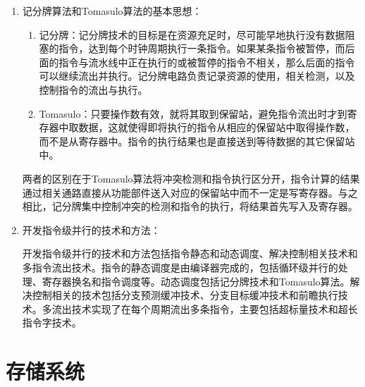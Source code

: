 \documentclass[a4paper]{ctexbook}
\begin{document}
\begin{enumerate}
  \item 记分牌算法和Tomasulo算法的基本思想：
  \begin{enumerate}
    \item 记分牌：记分牌技术的目标是在资源充足时，尽可能早地执行没有数据阻塞的指令，达到每个时钟周期执行一条指令。如果某条指令被暂停，而后面的指令与流水线中正在执行的或被暂停的指令不相关，那么后面的指令可以继续流出并执行。记分牌电路负责记录资源的使用，相关检测，以及控制指令的流出与执行。
    \item Tomasulo：只要操作数有效，就将其取到保留站，避免指令流出时才到寄存器中取数据，这就使得即将执行的指令从相应的保留站中取得操作数，而不是从寄存器中。指令的执行结果也是直接送到等待数据的其它保留站中。
  \end{enumerate}
  两者的区别在于Tomasulo算法将冲突检测和指令执行区分开，指令计算的结果通过相关通路直接从功能部件送入对应的保留站中而不一定是写寄存器。与之相比，记分牌集中控制冲突的检测和指令的执行，将结果首先写入及寄存器。
  
  \item 开发指令级并行的技术和方法：
  
  开发指令级并行的技术和方法包括指令静态和动态调度、解决控制相关技术和多指令流出技术。指令的静态调度是由编译器完成的，包括循环级并行的处理、寄存器换名和指令调度等。动态调度包括记分牌技术和Tomasulo算法。解决控制相关的技术包括分支预测缓冲技术、分支目标缓冲技术和前瞻执行技术。多流出技术实现了在每个周期流出多条指令，主要包括超标量技术和超长指令字技术。
    
\end{enumerate}

\newpage
\chapter{存储系统}
\end{document}
